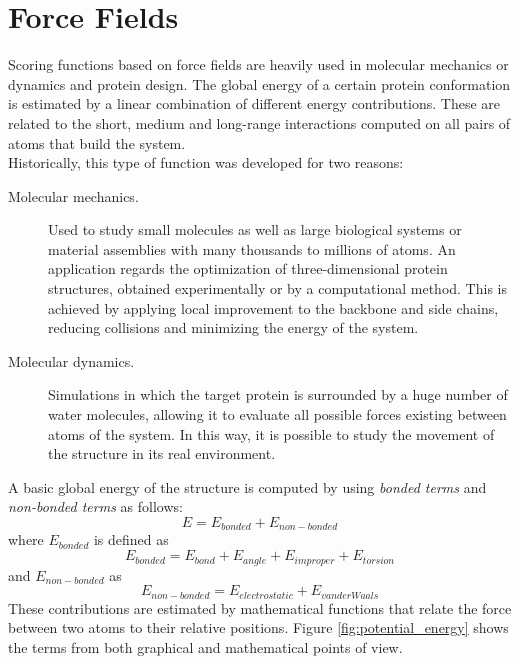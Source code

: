 \section{Force Fields}
\label{sec:force_fields}
Scoring functions based on force fields are heavily used in molecular mechanics or dynamics and protein design. The global energy of a certain protein conformation is estimated by a linear combination of different energy contributions. These are related to the short, medium and long-range interactions computed on all pairs of atoms that build the system.\\
Historically, this type of function was developed for two reasons:
\begin{description}
\item[Molecular mechanics.] Used to study small molecules as well as large biological systems or material assemblies with many thousands to millions of atoms. An application regards the optimization of three-\-di\-men\-sio\-nal protein structures, obtained experimentally or by a computational method. This is achieved by applying local improvement to the backbone and side chains, reducing collisions and minimizing the energy of the system.
\item[Molecular dynamics.] Simulations in which the target protein is surrounded by a huge number of water molecules, allowing it to evaluate all possible forces existing between atoms of the system. In this way, it is possible to study the movement of the structure in its real environment. 
\end{description}
A basic global energy of the structure is computed by using \emph{bonded terms} and \emph{non-bonded terms} as follows:
\begin{equation}
 	E = E_{bonded} + E_{non-bonded}
\end{equation}
where $E_{bonded}$ is defined as
\begin{equation}
 	E_{bonded} = E_{bond} + E_{angle} + E_{improper} + E_{torsion}
\end{equation}
and $E_{non-bonded}$ as
\begin{equation}
 	E_{non-bonded} = E_{electrostatic} + E_{vanderWaals}
\end{equation}
These contributions are estimated by mathematical functions that relate the force between two atoms to their relative positions. Figure \ref{fig:potential_energy} shows the terms from both graphical and mathematical points of view.\\
